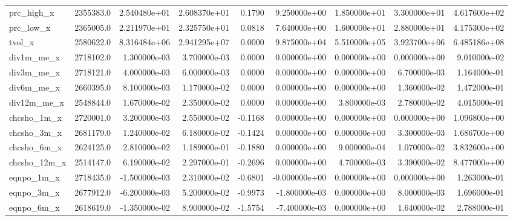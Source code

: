 \documentclass[10pt]{article}
\begin{document}
\begin{landscape}
\begin{longtable}{|l|r|r|r|r|r|r|r|r|}
prc\_high\_x              &  2355383.0 &  2.540480e+01 &  2.608370e+01 &      0.1790 &  9.250000e+00 &  1.850000e+01 &  3.300000e+01 &  4.617600e+02 \\
prc\_low\_x               &  2365005.0 &  2.211970e+01 &  2.325750e+01 &      0.0818 &  7.640000e+00 &  1.600000e+01 &  2.880000e+01 &  4.175300e+02 \\
tvol\_x                  &  2580622.0 &  8.316484e+06 &  2.941295e+07 &      0.0000 &  9.875000e+04 &  5.510000e+05 &  3.923700e+06 &  6.485186e+08 \\
div1m\_me\_x              &  2718102.0 &  1.300000e-03 &  3.700000e-03 &      0.0000 &  0.000000e+00 &  0.000000e+00 &  0.000000e+00 &  9.010000e-02 \\
div3m\_me\_x              &  2718121.0 &  4.000000e-03 &  6.000000e-03 &      0.0000 &  0.000000e+00 &  0.000000e+00 &  6.700000e-03 &  1.164000e-01 \\
div6m\_me\_x              &  2660395.0 &  8.100000e-03 &  1.170000e-02 &      0.0000 &  0.000000e+00 &  0.000000e+00 &  1.360000e-02 &  1.472000e-01 \\
div12m\_me\_x             &  2548844.0 &  1.670000e-02 &  2.350000e-02 &      0.0000 &  0.000000e+00 &  3.800000e-03 &  2.780000e-02 &  4.015000e-01 \\
chcsho\_1m\_x             &  2720001.0 &  3.200000e-03 &  2.550000e-02 &     -0.1168 &  0.000000e+00 &  0.000000e+00 &  0.000000e+00 &  1.096800e+00 \\
chcsho\_3m\_x             &  2681179.0 &  1.240000e-02 &  6.180000e-02 &     -0.1424 &  0.000000e+00 &  0.000000e+00 &  3.300000e-03 &  1.686700e+00 \\
chcsho\_6m\_x             &  2624125.0 &  2.810000e-02 &  1.189000e-01 &     -0.1880 &  0.000000e+00 &  9.000000e-04 &  1.070000e-02 &  3.832600e+00 \\
chcsho\_12m\_x            &  2514147.0 &  6.190000e-02 &  2.297000e-01 &     -0.2696 &  0.000000e+00 &  4.700000e-03 &  3.390000e-02 &  8.477000e+00 \\
eqnpo\_1m\_x              &  2718435.0 & -1.500000e-03 &  2.310000e-02 &     -0.6801 & -0.000000e+00 &  0.000000e+00 &  0.000000e+00 &  1.263000e-01 \\
eqnpo\_3m\_x              &  2677912.0 & -6.200000e-03 &  5.200000e-02 &     -0.9973 & -1.800000e-03 &  0.000000e+00 &  8.000000e-03 &  1.696000e-01 \\
eqnpo\_6m\_x              &  2618619.0 & -1.350000e-02 &  8.900000e-02 &     -1.5754 & -7.400000e-03 &  0.000000e+00 &  1.640000e-02 &  2.788000e-01 \\

\end{longtable}
\end{landscape}
\end{document}
